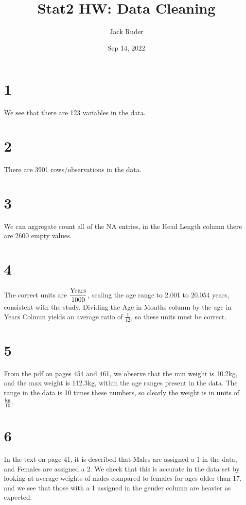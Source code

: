 \documentclass[a4paper]{article}
\title{Stat2 HW: Data Cleaning}
\date{Sep 14, 2022}
\author{Jack Ruder}
\begin{document}
\doublespacing
\maketitle

\section*{1}
We see that there are 123 variables in the data.

\section*{2}
There are 3901 rows/observations in the data.

\section*{3}%
We can aggregate count all of the NA entries, in the Head Length column there are 2600 empty values.

\section*{4}%
The correct units are \(\dfrac{\textnormal{Years}}{1000}\), scaling the age range to 2.001 to 20.054 years, consistent with the study. Dividing the Age in Months column by the age in Years Colmun yields an average ratio of \(\frac{1}{12}\), so these units must be correct.

\section*{5}%
From the pdf on pages 454 and 461, we observe that the min weight is 10.2kg, and the max weight is 112.3kg, within the age ranges present in the data.
The range in the data is 10 times these numbers, so clearly the weight is in units of \(\frac{\textnormal{kg}}{10}\).

\section*{6}%
In the text on page 41, it is described that Males are assigned a 1 in the data, and Females are assigned a 2. We check that this is accurate in the data set by
looking at average weights of males compared to females for ages older than 17, and we see that those with a 1 assigned in the gender column are heavier as expected. 
\end{document}

